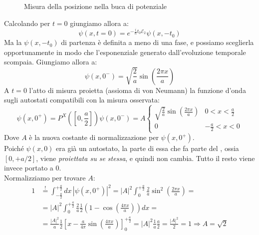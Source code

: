 \documentclass[../../FisicaTeorica.tex]{subfiles}
\begin{document}
\begin{enumerate}
\begin{figure}[H]
\caption{Misura della posizione nella buca di potenziale}

\end{figure}

Calcolando per $t=0$ giungiamo allora a:
\[
\psi(x,t=0)=e^{-\frac{i}{\hbar}t_0\mathcal{E}_2} \psi(x,-t_0)
\]
Ma la $\psi(x,-t_0)$ di partenza è definita a meno di una fase, e possiamo sceglierla opportunamente in modo che l'esponenziale generato dall'evoluzione temporale scompaia.
Giungiamo allora a:
\[
\psi(x,0^-)=\sqrt{\frac{2}{a}} \sin\left(\frac{2\pi x}{a}\right)
\]
A $t=0$ l'atto di misura proietta (assioma di von Neumann) la funzione d'onda sugli autostati compatibili con la misura osservata:
\[
\psi(x,0^+) = P^X\left(\left[0,\frac{a}{2}\right]\right)\psi(x,0^-)=A\begin{cases}
\sqrt{\frac{2}{a}}\sin\left(\frac{2\pi x}{a}\right) & 0 <x<\frac{a}{2}\\
0 & -\frac{a}{2}<x<0
\end{cases}
\]
Dove $A$ è la nuova costante di normalizzazione per $\psi(x,0^+)$.\\
Poiché $\psi(x,0)$ era già un autostato, la parte di essa che fa parte del , ossia $[0,+a/2]$, viene \textit{proiettata su se stessa}, e quindi non cambia. Tutto il resto viene invece portato a $0$.\\
Normalizziamo per trovare $A$:
\begin{align*}
1&\overset{!}{=}\int_{-\frac{a}{2}}^{+\frac{a}{2}} dx\,|\psi(x,0^+)|^2 = |A|^2 \int_0^{+\frac{a}{2}} \frac{2}{a}\sin^2\left(\frac{2\pi x}{a}\right)=\\
&=|A|^2 \int_0^{+\frac{a}{2}} \frac{2}{a}\frac{1}{2}\left(1-\cos\left(\frac{4\pi x}{a}\right)\right) dx =\\
&=\frac{|A|^2}{a} \frac{1}{2}\left[x-\frac{a}{4\pi}\sin\left(\frac{4\pi x}{a}\right)\right]_0^{+\frac{a}{2}} =|A|^2 \frac{1}{a} \frac{a}{2} = \frac{|A|^2}{2}=1\Rightarrow A=\sqrt{2}

\end{align*}
\end{enumerate}
\end{document}
